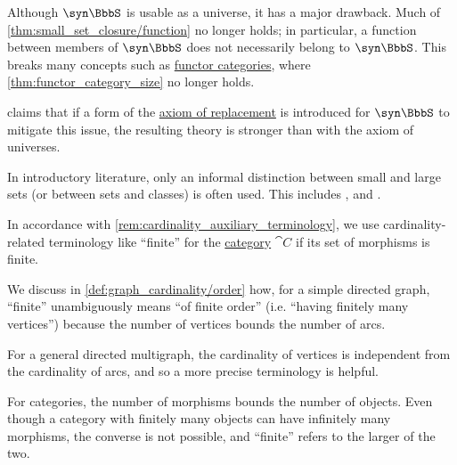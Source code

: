 \begin{remark}
\begin{thmenum}
    Although \( \syn\BbbS \) is usable as a universe, it has a major drawback. Much of \cref{thm:small_set_closure/function} no longer holds; in particular, a function between members of \( \syn\BbbS \) does not necessarily belong to \( \syn\BbbS \). This breaks many concepts such as \hyperref[def:functor_category]{functor categories}, where \cref{thm:functor_category_size} no longer holds.

    \Textcite[26]{Shulman2008SetTheoryForCategoryTheory} claims that if a form of the \hyperref[def:zfc/replacement]{axiom of replacement} is introduced for \( \syn\BbbS \) to mitigate this issue, the resulting theory is stronger than  with the axiom of universes.
  \end{thmenum}
\end{remark}
\begin{comments}
  \item In introductory literature, only an informal distinction between small and large sets (or between sets and classes) is often used. This includes
  \cite[def. 1.1.1]{Perrone2024StartingCategoryTheory},
  \cite[def. 1.11]{Awodey2010CategoryTheory} and
  \cite[def. I.3.1]{Aluffi2009Algebra}.
\end{comments}

\begin{definition}\label{def:category_cardinality}
  In accordance with \cref{rem:cardinality_auxiliary_terminology}, we use cardinality-related terminology like \enquote{finite} for the \hyperref[def:category]{category} \( \cat{C} \) if its set of morphisms is finite.
\end{definition}
\begin{comments}
  \item We discuss in \cref{def:graph_cardinality/order} how, for a simple directed graph, \enquote{finite} unambiguously means \enquote{of finite order} (i.e. \enquote{having finitely many vertices}) because the number of vertices bounds the number of arcs.

  For a general directed multigraph, the cardinality of vertices is independent from the cardinality of arcs, and so a more precise terminology is helpful.

  For categories, the number of morphisms bounds the number of objects. Even though a category with finitely many objects can have infinitely many morphisms, the converse is not possible, and \enquote{finite} refers to the larger of the two.
\end{comments}

